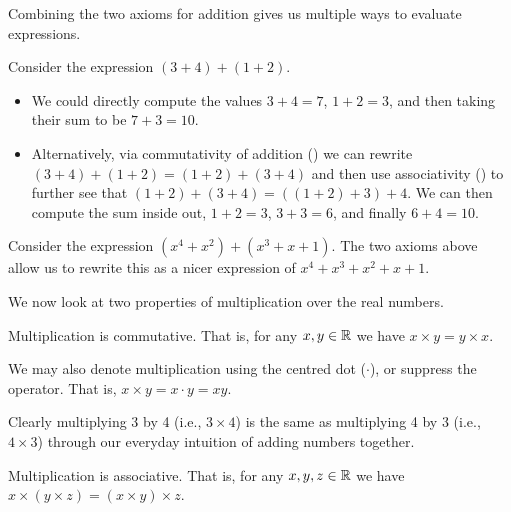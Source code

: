 Combining the two axioms for addition gives us multiple ways to evaluate expressions.
\begin{example}
    Consider the expression $(3 + 4) + (1 + 2)$.
    \begin{itemize}
        \item We could directly compute the values $3 + 4 = 7$, $1 + 2 = 3$, and then taking their sum to be $7 + 3 = 10$.
        \item Alternatively, via commutativity of addition () we can rewrite $(3 + 4) + (1 + 2) = (1+2)+(3+4)$ and then use associativity () to further see that $(1+2)+(3+4) = ((1+2)+3)+4$. We can then compute the sum inside out, $1 + 2 = 3$, $3 + 3 = 6$, and finally $6 + 4 = 10$.
    \end{itemize}
\end{example}

\begin{example}
    Consider the expression $(x^4 + x^2) + (x^3 + x + 1)$. The two axioms above allow us to rewrite this as a nicer expression of $x^4 + x^3 + x^2 + x + 1$.
\end{example}

We now look at two properties of multiplication over the real numbers.
\begin{axiom}\label{axiom-multiplication-is-commutative}
    Multiplication is commutative. That is, for any $x, y \in \mathbb{R}$ we have $x \times y = y \times x$.
\end{axiom}
\begin{remark}
    We may also denote multiplication using the centred dot ($\cdot$), or suppress the operator. That is, $x\times y = x\cdot y = xy$.
\end{remark}

\begin{example}
    Clearly multiplying 3 by 4 (i.e., $3 \times 4$) is the same as multiplying 4 by 3 (i.e., $4 \times 3$) through our everyday intuition of adding numbers together.
\end{example}

\begin{axiom}\label{axiom-multiplication-is-associative}
    Multiplication is associative. That is, for any $x, y, z \in \mathbb{R}$ we have $x\times(y\times z) = (x\times y)\times z$.
\end{axiom}

